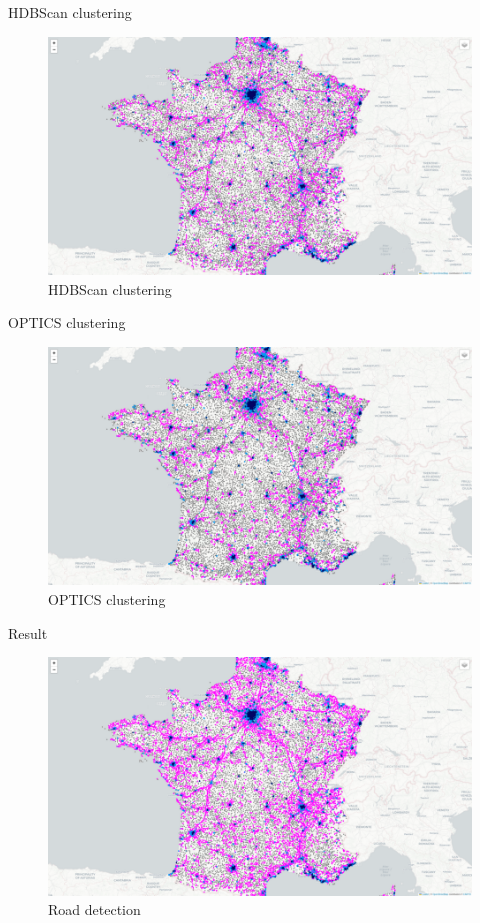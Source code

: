 \begin{frame}{HDBScan clustering}
    \begin{figure}
        \includegraphics[height=0.6\paperheight]{images/cartes/road_detection/hdb.png}
        \caption{HDBScan clustering}
    \end{figure}
\end{frame}

\begin{frame}{OPTICS clustering}
    \begin{figure}
        \includegraphics[height=0.6\paperheight]{images/cartes/road_detection/opt.png}
        \caption{OPTICS clustering}
    \end{figure}
\end{frame}

\begin{frame}{Result}
    \begin{figure}
        \includegraphics[height=0.6\paperheight]{images/cartes/road_detection/res.png}
        \caption{Road detection}
    \end{figure}
\end{frame}